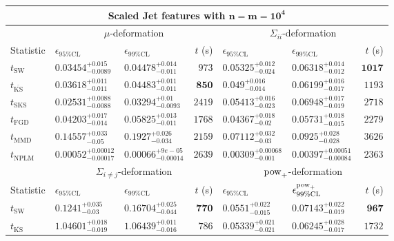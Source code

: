 \begin{tabular}{l|llr|llr}
	\toprule
	\multicolumn{7}{c}{{\bf Scaled Jet features with $\mathbf{n=m=10^{4}}$}} \\
	\toprule
	\multicolumn{1}{c}{} & \multicolumn{3}{c}{$\mu$-deformation} & \multicolumn{3}{c}{$\Sigma_{ii}$-deformation} \\
	Statistic & $\epsilon_{95\%\mathrm{CL}}$ & $\epsilon_{99\%\mathrm    {CL}}$ & $t$ (s) & $\epsilon_{95\%\mathrm{CL}}$ & $\epsilon_{99\%\mathrm{CL}}$ & $t$ (s) \\
	\midrule
	$t_{\mathrm{SW}}$ & $0.03454_{-0.0089}^{+0.015}$ & $0.04478_{-0.011}^{+0.014}$ & $973$ & $0.05325_{-0.024}^{+0.012}$ & $0.06318_{-0.012}^{+0.014}$ & ${\mathbf{1017}}$ \\
	$t_{\overline{\mathrm{KS}}}$ & $0.03618_{-0.011}^{+0.011}$ & $0.04483_{-0.011}^{+0.011}$ & ${\mathbf{850}}$ & $0.049_{-0.014}^{+0.016}$ & $0.06199_{-0.017}^{+0.016}$ & $1193$ \\
	$t_{\mathrm{SKS}}$ & ${\mathbf{0.02531_{-0.0088}^{+0.0088}}}$ & ${\mathbf{0.03294_{-0.0093}^{+0.01}}}$ & $2419$ & $0.05413_{-0.023}^{+0.016}$ & $0.06948_{-0.019}^{+0.017}$ & $2718$ \\
	$t_{\mathrm{FGD}}$ & $0.04203_{-0.014}^{+0.017}$ & $0.05825_{-0.011}^{+0.013}$ & $1768$ & ${\mathbf{0.04367_{-0.02}^{+0.018}}}$ & ${\mathbf{0.05731_{-0.015}^{+0.018}}}$ & $2279$ \\
	$t_{\mathrm{MMD}}$ & $0.14557_{-0.05}^{+0.033}$ & $0.1927_{-0.034}^{+0.026}$ & $2159$ & $0.07112_{-0.03}^{+0.032}$ & $0.0925_{-0.028}^{+0.028}$ & $3626$ \\
\rowcolor{red!35}	$t_{\mathrm{NPLM}}$ & $0.00052_{-0.00017}^{+0.00012}$ & $0.00066_{-0.00014}^{+9e-05}$ & $2639$ & $0.00309_{-0.001}^{+0.00068}$ & $0.00397_{-0.00084}^{+0.00051}$ & $2363$ \\
	\toprule
	\multicolumn{1}{c}{} & \multicolumn{3}{c}{$\Sigma_{i\neq j}$-deformation} & \multicolumn{3}{c}{$\rm{pow}_{+}$-deformation} \\
	Statistic & $\epsilon_{95\%\mathrm{CL}}$ & $\epsilon_{99\%\mathrm{CL}}$ & $t$ (s) & $\epsilon_{95\%\mathrm{CL}}$ & $\epsilon^{\rm   {pow}_{+}}_{99\%\mathrm{CL}}$ & $t$ (s) \\
	\midrule
	$t_{\mathrm{SW}}$ & $0.1241_{-0.03}^{+0.035}$ & $0.16704_{-0.044}^{+0.025}$ & ${\mathbf{770}}$ & $0.0551_{-0.015}^{+0.022}$ & $0.07143_{-0.019}^{+0.022}$ & ${\mathbf{967}}$ \\
	$t_{\overline{\mathrm{KS}}}$ & $1.04601_{-0.019}^{+0.018}$ & $1.06439_{-0.016}^{+0.011}$ & $786$ & $0.05339_{-0.021}^{+0.021}$ & $0.06245_{-0.017}^{+0.028}$ & $1732$ \\

\end{tabular}
